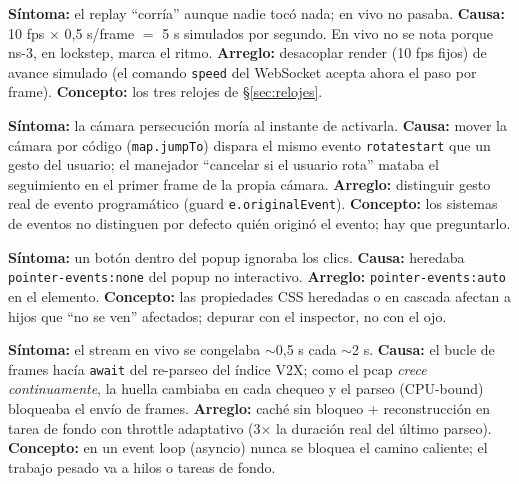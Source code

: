 \documentclass[11pt,a4paper]{article}
\begin{document}
\begin{casobox}
\textbf{Síntoma:} el replay ``corría'' aunque nadie tocó nada; en vivo no
pasaba. \textbf{Causa:} 10 fps $\times$ 0{,}5 s/frame $=$ 5 s simulados por
segundo. En vivo no se nota porque ns-3, en lockstep, marca el ritmo.
\textbf{Arreglo:} desacoplar render (10 fps fijos) de avance simulado (el
comando \texttt{speed} del WebSocket acepta ahora el paso por frame).
\textbf{Concepto:} los tres relojes de \S\ref{sec:relojes}.
\end{casobox}

\begin{casobox}
\textbf{Síntoma:} la cámara persecución moría al instante de activarla.
\textbf{Causa:} mover la cámara por código (\texttt{map.jumpTo}) dispara el
mismo evento \texttt{rotatestart} que un gesto del usuario; el manejador
``cancelar si el usuario rota'' mataba el seguimiento en el primer frame de la
propia cámara. \textbf{Arreglo:} distinguir gesto real de evento programático
(guard \texttt{e.originalEvent}). \textbf{Concepto:} los sistemas de eventos
no distinguen por defecto quién originó el evento; hay que preguntarlo.
\end{casobox}

\begin{casobox}
\textbf{Síntoma:} un botón dentro del popup ignoraba los clics.
\textbf{Causa:} heredaba \texttt{pointer-events:none} del popup no
interactivo. \textbf{Arreglo:} \texttt{pointer-events:auto} en el elemento.
\textbf{Concepto:} las propiedades CSS heredadas o en cascada afectan a hijos
que ``no se ven'' afectados; depurar con el inspector, no con el ojo.
\end{casobox}

\begin{casobox}\label{caso:pausas}
\textbf{Síntoma:} el stream en vivo se congelaba $\sim$0{,}5 s cada $\sim$2 s.
\textbf{Causa:} el bucle de frames hacía \texttt{await} del re-parseo del
índice V2X; como el pcap \emph{crece continuamente}, la huella cambiaba en
cada chequeo y el parseo (CPU-bound) bloqueaba el envío de frames.
\textbf{Arreglo:} caché sin bloqueo + reconstrucción en tarea de fondo con
throttle adaptativo (3$\times$ la duración real del último parseo).
\textbf{Concepto:} en un event loop (asyncio) nunca se bloquea el camino
caliente; el trabajo pesado va a hilos o tareas de fondo.
\end{casobox}
\end{document}
